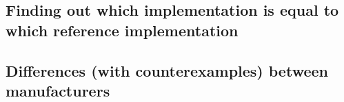 \documentclass[11pt,a4paper]{article}
\begin{document}
\subsection{Finding out which implementation is equal to which reference implementation}

\subsection{Differences (with counterexamples) between manufacturers}
\end{document}
